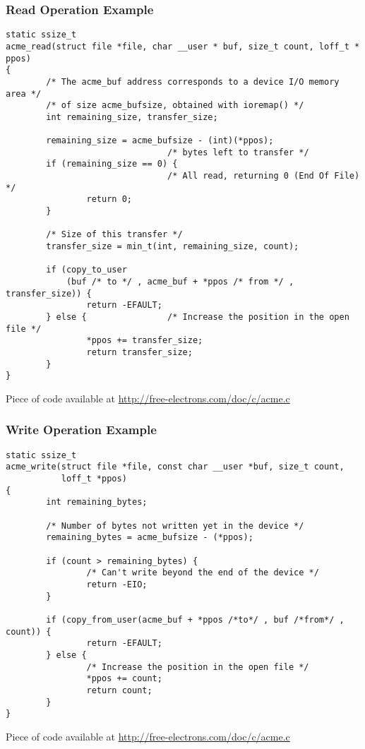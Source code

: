 \begin{frame}[fragile]
  \frametitle{Read Operation Example}
\begin{verbatim}
static ssize_t
acme_read(struct file *file, char __user * buf, size_t count, loff_t * ppos)
{
        /* The acme_buf address corresponds to a device I/O memory area */
        /* of size acme_bufsize, obtained with ioremap() */
        int remaining_size, transfer_size;

        remaining_size = acme_bufsize - (int)(*ppos);
                                /* bytes left to transfer */
        if (remaining_size == 0) {
                                /* All read, returning 0 (End Of File) */
                return 0;
        }

        /* Size of this transfer */
        transfer_size = min_t(int, remaining_size, count);

        if (copy_to_user
            (buf /* to */ , acme_buf + *ppos /* from */ , transfer_size)) {
                return -EFAULT;
        } else {                /* Increase the position in the open file */
                *ppos += transfer_size;
                return transfer_size;
        }
}
\end{verbatim}
Piece of code available at \url{http://free-electrons.com/doc/c/acme.c}
\end{frame}

\begin{frame}[fragile]
  \frametitle{Write Operation Example}
\begin{verbatim}
static ssize_t
acme_write(struct file *file, const char __user *buf, size_t count,
           loff_t *ppos)
{
        int remaining_bytes;

        /* Number of bytes not written yet in the device */
        remaining_bytes = acme_bufsize - (*ppos);

        if (count > remaining_bytes) {
                /* Can't write beyond the end of the device */
                return -EIO;
        }

        if (copy_from_user(acme_buf + *ppos /*to*/ , buf /*from*/ , count)) {
                return -EFAULT;
        } else {
                /* Increase the position in the open file */
                *ppos += count;
                return count;
        }
}
\end{verbatim}
Piece of code available at \url{http://free-electrons.com/doc/c/acme.c}
\end{frame}


